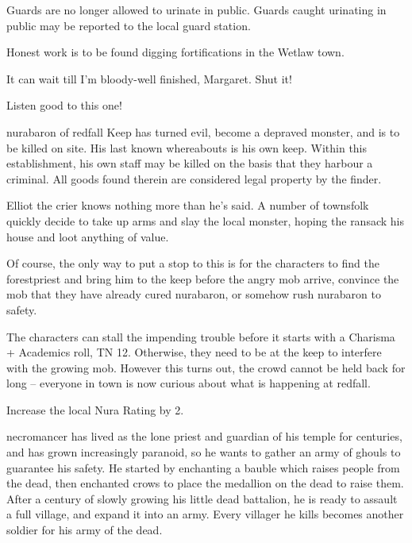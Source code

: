 \begin{multicols}{2}
\begin{speechtext}
		Guards are no longer allowed to urinate in public.
		Guards caught urinating in public may be reported to the local guard station.

		Honest work is to be found digging fortifications in the Wetlaw town.

		It can wait till I'm bloody-well finished, Margaret.  Shut it!

		Listen good to this one!

		\gls{nurabaron} of \gls{redfall} Keep has turned evil, become a depraved monster, and is to be killed on site.  His last known whereabouts is his own keep.  Within this establishment, his own staff may be killed on the basis that they harbour a criminal.  All goods found therein are considered legal property by the finder.

\end{speechtext}

Elliot the crier knows nothing more than he's said.  A number of townsfolk quickly decide to take up arms and slay the local monster, hoping the ransack his house and loot anything of value.

Of course, the only way to put a stop to this is for the characters to find the \gls{forestpriest} and bring him to the keep before the angry mob arrive, convince the mob that they have already cured \gls{nurabaron}, or somehow rush \gls{nurabaron} to safety.

The characters can stall the impending trouble before it starts with a Charisma + Academics roll, TN 12.
Otherwise, they need to be at the keep to interfere with the growing mob.
However this turns out, the crowd cannot be held back for long -- everyone in town is now curious about what is happening at \gls{redfall}.

Increase the local Nura Rating by 2.

\stopcontents[sq]

\resumecontents[Forest]

\label{necromancerspet}

\stopcontents[Forest]

\startcontents[sq]

\sqminitoc

\Gls{necromancer} has lived as the lone priest and guardian of his temple for centuries, and has grown increasingly paranoid, so he wants to gather an army of ghouls to guarantee his safety.
He started by enchanting a bauble which raises people from the dead, then enchanted crows to place the medallion on the dead to raise them.
After a century of slowly growing his little dead battalion, he is ready to assault a full village, and expand it into an army.
Every villager he kills becomes another soldier for his army of the dead.


\end{multicols}
